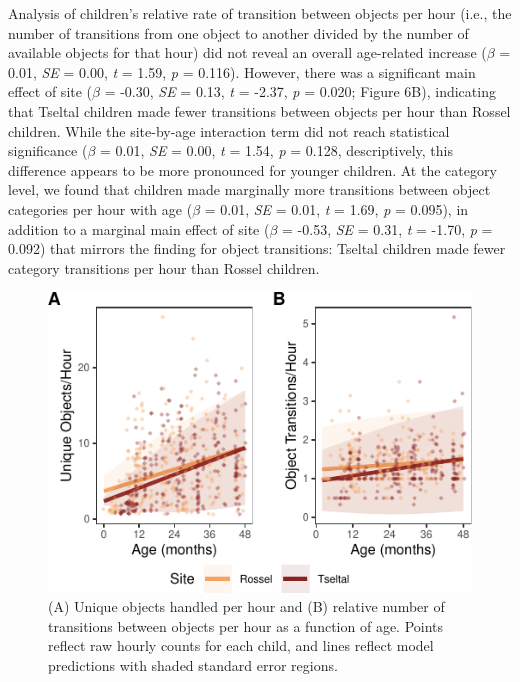 \documentclass[10pt, letterpaper]{article}
\newenvironment{CodeChunk}{}{}
\begin{document}
Analysis of children's relative rate of transition between objects per
hour (i.e., the number of transitions from one object to another divided
by the number of available objects for that hour) did not reveal an
overall age-related increase (\(\beta\) = 0.01, \emph{SE} = 0.00,
\emph{t} = 1.59, \emph{p} = 0.116). However, there was a significant
main effect of site (\(\beta\) = -0.30, \emph{SE} = 0.13, \emph{t} =
-2.37, \emph{p} = 0.020; Figure 6B), indicating that Tseltal children
made fewer transitions between objects per hour than Rossel children.
While the site-by-age interaction term did not reach statistical
significance (\(\beta\) = 0.01, \emph{SE} = 0.00, \emph{t} = 1.54,
\emph{p} = 0.128, descriptively, this difference appears to be more
pronounced for younger children. At the category level, we found that
children made marginally more transitions between object categories per
hour with age (\(\beta\) = 0.01, \emph{SE} = 0.01, \emph{t} = 1.69,
\emph{p} = 0.095), in addition to a marginal main effect of site
(\(\beta\) = -0.53, \emph{SE} = 0.31, \emph{t} = -1.70, \emph{p} =
0.092) that mirrors the finding for object transitions: Tseltal children
made fewer category transitions per hour than Rossel children.

\begin{CodeChunk}
\begin{figure}[!ht]

{\centering \includegraphics{figs/age-effects-fig-1} 

}

\caption[(A) Unique objects handled per hour and (B) relative number of transitions between objects per hour as a function of age]{(A) Unique objects handled per hour and (B) relative number of transitions between objects per hour as a function of age. Points reflect raw hourly counts for each child, and lines reflect model predictions with shaded standard error regions.}\label{fig:age-effects-fig}
\end{figure}
\end{CodeChunk}
\end{document}
